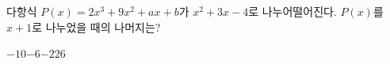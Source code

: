 다항식 $P(x)=2x^3+9x^2+ax+b$가 $x^2+3x-4$로 나누어떨어진다. $P(x)$를 $x+1$로 나누었을 때의 나머지는? 
\begin{choices32}{$-10$}{$-6$}{$-2$}{$2$}{$6$}\end{choices32}
